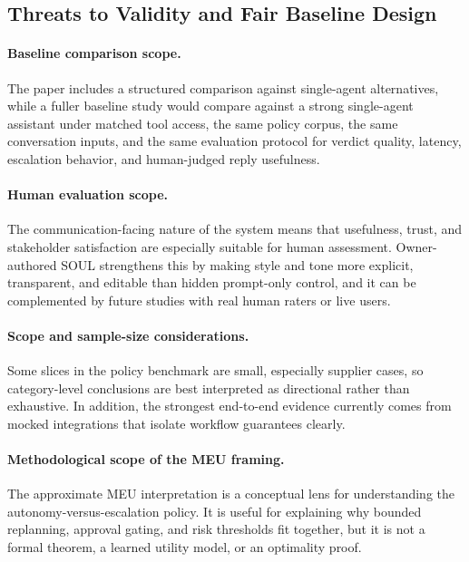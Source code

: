 \documentclass[11pt]{article}
\begin{document}
\subsection{Threats to Validity and Fair Baseline Design}
\label{app:eval-validity}

\paragraph{Baseline comparison scope.}
The paper includes a structured comparison against single-agent alternatives, while a fuller baseline study would compare against a strong single-agent assistant under matched tool access, the same policy corpus, the same conversation inputs, and the same evaluation protocol for verdict quality, latency, escalation behavior, and human-judged reply usefulness.

\paragraph{Human evaluation scope.}
The communication-facing nature of the system means that usefulness, trust, and stakeholder satisfaction are especially suitable for human assessment. Owner-authored SOUL strengthens this by making style and tone more explicit, transparent, and editable than hidden prompt-only control, and it can be complemented by future studies with real human raters or live users.

\paragraph{Scope and sample-size considerations.}
Some slices in the policy benchmark are small, especially supplier cases, so category-level conclusions are best interpreted as directional rather than exhaustive. In addition, the strongest end-to-end evidence currently comes from mocked integrations that isolate workflow guarantees clearly.

\paragraph{Methodological scope of the MEU framing.}
The approximate MEU interpretation is a conceptual lens for understanding the autonomy-versus-escalation policy. It is useful for explaining why bounded replanning, approval gating, and risk thresholds fit together, but it is not a formal theorem, a learned utility model, or an optimality proof.
\end{document}
